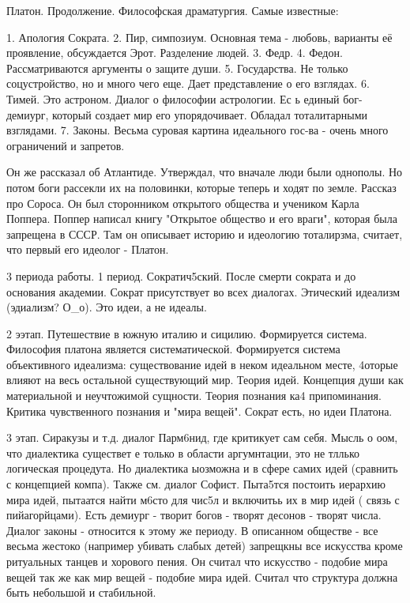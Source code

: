 Платон. Продолжение.
Философская драматургия.
Самые известные:

	1. Апология Сократа. 
	2. Пир, симпозиум. Основная тема - любовь, варианты её проявление, обсуждается Эрот. Разделение людей.
	3. Федр.
	4. Федон. Рассматриваются аргументы о защите души.
	5. Государства. Не только соцустройство, но и много чего еще. Дает представление о его взглядах.
	6. Тимей. Это астроном. Диалог о философии астрологии. Ес ь единый бог-демиург, который создает мир  его упорядочивает. Обладал тоталитарными взглядами.
	7. Законы. Весьма суровая картина идеального гос-ва - очень много ограничений и запретов.

Он же рассказал об Атлантиде. 
Утверждал, что вначале люди были однополы. Но потом боги рассекли их на половинки, которые теперь и ходят по земле.
Рассказ про Сороса. Он был сторонником открытого общества и учеником Карла Поппера. 
Поппер написал книгу "Открытое общество и его враги", которая была запрещена в СССР. 
Там он описывает историю и идеологию тоталирзма, считает, что первый его идеолог - Платон.

3 периода работы.
1 период. Сократич5ский. После смерти сократа и до основания академии. Сократ присутствует во всех диалогах. Этический идеализм (эдиализм? О_о). Это идеи, а не идеалы.

2 ээтап. Путешествие в южную италию и сицилию. Формируется система. Философия платона является систематической. 
Формируется система объективного идеализма: существование идей в неком идеальном месте, 4оторые влияют на весь остальной существующий мир. Теория идей. Концепция души как материальной и неучтожимой сущности. 
Теория познания ка4 припоминания. Критика чувственного познания и "мира вещей". Сократ есть, но идеи Платона.

3 этап. Сиракузы и т.д. диалог Парм6нид, где критикует сам себя. Мысль о оом, что диалектика существет е только в области аргумнтации, это не тллько логическая процедута. 
Но диалектика ыозможна и в сфере самих идей (сравнить с концепцией компа). Также см. диалог Софист. Пыта5тся постоить иерархию мира идей, пытаатся найти м6сто для чис5л и включитьь их в мир идей ( связь с пийагорйцами). 
Есть демиург - творит богов - творят десонов - творят числа. Диалог законы - относится к этому же периоду. 
В описанном обществе - все весьма жестоко (например убивать слабых детей) запрещкны все искусства кроме ритуальных танцев и хорового пения. 
Он считал что искусство - подобие мира вещей так же как мир вещей - подобие мира идей. Считал что структура должна быть небольшой и стабильной.

